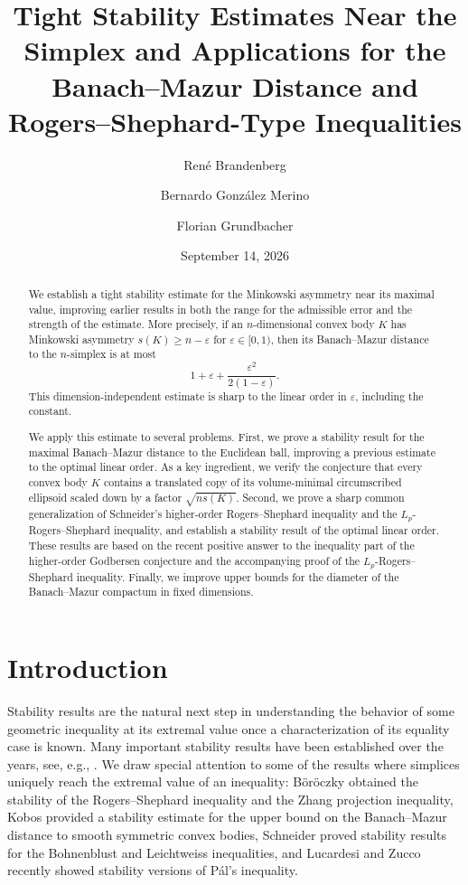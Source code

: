 \documentclass{amsart}
\title[Tight stability estimates near the simplex]{Tight Stability Estimates Near the Simplex and Applications for the Banach--Mazur Distance and Rogers--Shephard-Type Inequalities}
\author[R. Brandenberg]{Ren\'e Brandenberg}
\author[B. Gonz\'alez Merino]{Bernardo Gonz\'alez Merino}
\author[F. Grundbacher]{Florian Grundbacher}
\date{September 14, 2026}
\begin{document}
\begin{abstract}
We establish a tight stability estimate for the Minkowski asymmetry near its maximal value, improving earlier results in both the range for the admissible error and the strength of the estimate. More precisely, if an $n$-dimensional convex body $K$ has Minkowski asymmetry $s(K) \geq n-\varepsilon$ for $\varepsilon \in [0,1)$, then its Banach--Mazur distance to the $n$-simplex is at most
\[ 1 + \varepsilon + \frac{\varepsilon^2}{2(1-\varepsilon)}. \]
This dimension-independent estimate is sharp to the linear order in $\varepsilon$, including the constant.

We apply this estimate to several problems. First, we prove a stability result for the maximal Banach--Mazur distance to the Euclidean ball, improving a previous estimate to the optimal linear order. As a key ingredient, we verify the conjecture that every convex body $K$ contains a translated copy of its volume-minimal circumscribed ellipsoid scaled down by a factor $\sqrt{n s(K)}$.
Second, we prove a sharp common generalization of Schneider's higher-order Rogers--Shephard inequality and the $L_p$-Rogers--Shephard inequality, and establish a stability result of the optimal linear order. These results are based on the recent positive answer to the inequality part of the higher-order Godbersen conjecture and the accompanying proof of the $L_p$-Rogers--Shephard inequality. Finally, we improve upper bounds for the diameter of the Banach--Mazur compactum in fixed dimensions.
\end{abstract}


\maketitle



\section{Introduction}



Stability results are the natural next step in understanding the behavior of some geometric inequality at its extremal value once a characterization of its equality case is known.
Many important stability results have been established over the years,
see, e.g., \cite{2011:BallBöröczky,2005:Böröczky,2010:Böröczky,2026:BöröczkyPatsalosSaroglou,2025:FigalliHintumTiba,2010:FigalliMaggiPratelli,2008:FuscoMaggiPratelli}.
We draw special attention to some of the results where simplices uniquely reach the extremal value of an inequality:
B\"or\"oczky \cite{2005:Böröczky} obtained the stability of the Rogers--Shephard inequality and the Zhang projection inequality,
Kobos \cite{2019:Kobos} provided a stability estimate for the upper bound on the Banach--Mazur distance to smooth symmetric convex bodies, 
Schneider \cite{2009:Schneider} proved stability results for the Bohnenblust and Leichtweiss inequalities,
and Lucardesi and Zucco \cite{2025:LucardesiZucco} recently showed stability versions of P\'al's inequality.
\end{document}
